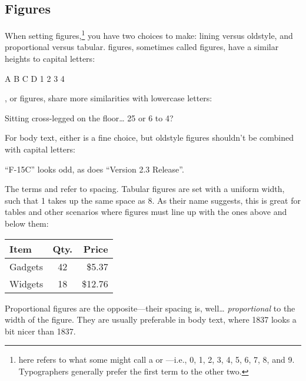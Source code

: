 \subsection{Figures}

When setting figures,\punckern\footnote{
here refers to what some might call a  or
---i.e., 0, 1, 2, 3, 4, 5, 6, 7, 8, and 9.
Typographers generally prefer the first term to the other two.}
you have two
choices to make: lining versus oldstyle,
and proportional versus tabular.
 figures, sometimes called  figures,
have a similar heights to capital letters:
\begin{leftfigure}
A B C D 1 2 3 4
\end{leftfigure}
, or  figures,
share more similarities with lowercase letters:
\begin{leftfigure}
Sitting cross-legged on the floor\ldots{} 25 or 6 to 4?
\end{leftfigure}
For body text, either is a fine choice, but oldstyle figures shouldn't
be combined with capital letters:
\begin{leftfigure}
``F-15C'' looks odd, as does ``Version 2.3 Release''\quotekern.
\end{leftfigure}

{
The terms  and  refer to spacing.
Tabular figures are set with a uniform width, such that 1 takes up
the same space as 8.
As their name suggests, this is great for tables and other scenarios
where figures must line up with the ones above and below them:}
\begin{leftfigure}
\begin{tabular}{l|c r}
Item & Qty. & Price \\
\hline
Gadgets & 42 & \$5.37 \\
Widgets & 18 & \$12.76 \\
\end{tabular}
\end{leftfigure}
Proportional figures are the opposite---their spacing is, well\ldots{}
\emph{proportional} to the width of the figure.
They are usually preferable in body text, where 1837
looks a bit nicer than
{1837}.

